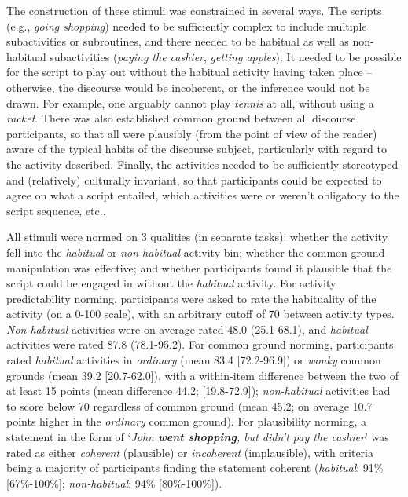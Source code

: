\documentclass{sp}\usepackage[]{graphicx}\usepackage[]{color}
\begin{document}
The construction of these stimuli was constrained in several ways. The scripts (e.g., \textit{going shopping}) needed to be sufficiently complex to include multiple subactivities or subroutines, and there needed to be habitual as well as non-habitual subactivities (\textit{paying the cashier}, \textit{getting apples}). It needed to be possible for the script to play out without the habitual activity having taken place -- otherwise, the discourse would be incoherent, or the inference would not be drawn.  For example, one arguably cannot play \textit{tennis} at all, without using a \textit{racket}. There was also established common ground between all discourse participants, so that all were plausibly (from the point of view of the reader) aware of the typical habits of the discourse subject, particularly with regard to the activity described. Finally, the activities needed to be sufficiently stereotyped and (relatively) culturally invariant, so that participants could be expected to agree on what a script entailed, which activities were or weren't obligatory to the script sequence, etc..

All stimuli were normed on 3 qualities (in separate tasks): whether the activity fell into the \textit{habitual} or \textit{non-habitual} activity bin; whether the common ground manipulation was effective; and whether participants found it plausible that the script could be engaged in without the \textit{habitual} activity.  For activity predictability norming, participants were asked to rate the habituality of the activity (on a 0-100 scale), with an arbitrary cutoff of 70 between activity types.  \textit{Non-habitual} activities were on average rated 48.0 (25.1-68.1), and \textit{habitual} activities were rated 87.8 (78.1-95.2).  For common ground norming, participants rated \textit{habitual} activities in \textit{ordinary} (mean 83.4 [72.2-96.9]) or \textit{wonky} common grounds (mean 39.2 [20.7-62.0]), with a within-item difference between the two of at least 15 points (mean difference 44.2; [19.8-72.9]); \textit{non-habitual} activities had to score below 70 regardless of common ground (mean 45.2; on average 10.7 points higher in the \textit{ordinary} common ground).  For plausibility norming, a statement in the form of `\textit{John \textbf{went shopping}, but didn't pay the cashier}' was rated as either \textit{coherent} (plausible) or \textit{incoherent} (implausible), with criteria being a majority of participants finding the statement coherent (\textit{habitual}: 91\% [67\%-100\%]; \textit{non-habitual}: 94\% [80\%-100\%]).
\end{document}
